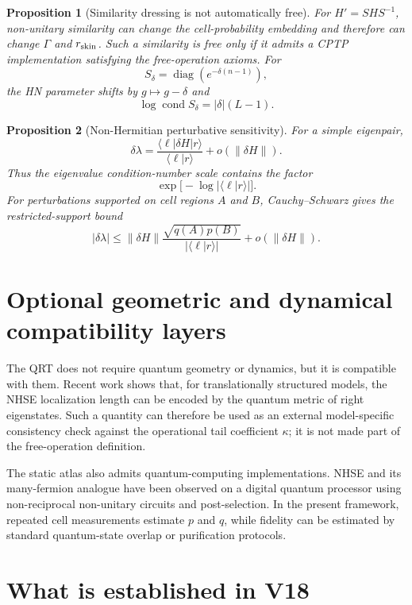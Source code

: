 \documentclass[11pt]{article}
\newtheorem{proposition}{Proposition}
\newcommand{\rskin}{r_{\rm skin}}
\begin{document}
\begin{proposition}[Similarity dressing is not automatically free]
For \(H'=SHS^{-1}\), non-unitary similarity can change the cell-probability embedding and therefore can change \(\Gamma\) and \(\rskin\). Such a similarity is free only if it admits a CPTP implementation satisfying the free-operation axioms. For
\[
S_\delta=\operatorname{diag}(e^{-\delta(n-1)}),
\]
the HN parameter shifts by \(g\mapsto g-\delta\) and
\[
\log\operatorname{cond}S_\delta
=|\delta|(L-1).
\]
\end{proposition}

\begin{proposition}[Non-Hermitian perturbative sensitivity]
For a simple eigenpair,
\[
\delta\lambda
=
\frac{\langle\ell|\delta H|r\rangle}
{\langle\ell|r\rangle}
+o(\|\delta H\|).
\]
Thus the eigenvalue condition-number scale contains the factor
\[
\exp\bigl[-\log|\langle\ell|r\rangle|\bigr].
\]
For perturbations supported on cell regions \(A\) and \(B\), Cauchy--Schwarz gives the restricted-support bound
\[
|\delta\lambda|
\le
\|\delta H\|
\frac{\sqrt{q(A)p(B)}}{|\langle\ell|r\rangle|}
+o(\|\delta H\|).
\]
\end{proposition}

\section{Optional geometric and dynamical compatibility layers}

The QRT does not require quantum geometry or dynamics, but it is compatible with them. Recent work shows that, for translationally structured models, the NHSE localization length can be encoded by the quantum metric of right eigenstates. \cite{QuantumGeometry} Such a quantity can therefore be used as an external model-specific consistency check against the operational tail coefficient \(\kappa\); it is not made part of the free-operation definition.

The static atlas also admits quantum-computing implementations. NHSE and its many-fermion analogue have been observed on a digital quantum processor using non-reciprocal non-unitary circuits and post-selection. \cite{DigitalNHSE} In the present framework, repeated cell measurements estimate \(p\) and \(q\), while fidelity can be estimated by standard quantum-state overlap or purification protocols.

\section{What is established in V18}
\end{document}
